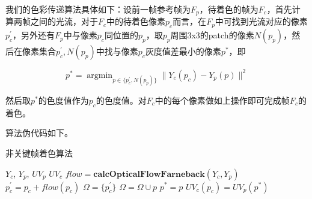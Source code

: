   我们的色彩传递算法具体如下：设前一帧参考帧为$F_p$，待着色的帧为$F_c$，首先计算两帧之间的光流，对于$F_c$中的待着色像素$p_c$而言，在$F_p$中可找到光流对应的像素$p_c^{'}$，另外还有$F_p$中与像素$p_c$同位置的$p_p$，取$p_p$周围3x3的patch的像素$N(p_p)$，然后在像素集合${p_c^{'},N(p_p)}$中找与像素$p_c$灰度值差最小的像素$p^*$，即

  \begin{equation}
  \label{equ:5-interframe}
    p^* = \mathop{\arg\min}_{p \in \{p_c^{'},N(p_p)\}} \|Y_c(p_c) - Y_p(p)\|^2
  \end{equation}

  然后取$p^*$的色度值作为$p_c$的色度值。对$F_c$中的每个像素做如上操作即可完成帧$F_c$的着色。

  算法伪代码如下。

  \begin{algorithm}[H]
  \label{algo:5-interframe}
    \caption*{非关键帧着色算法}
    \begin{algorithmic}[1]
      \Require $Y_c$, $Y_p$, $UV_p$
      \Ensure  $UV_c$
        \State $flow = \textbf{calcOpticalFlowFarneback}(Y_c, Y_p)$
          \State $p_c^{'} = p_c + flow(p_c)$
          \State $\Omega = \{p_c^{'}\}$
            \State $\Omega = \Omega \cup p$
          \EndFor
              \State $p^* = p$
            \EndIf
          \EndFor
          \State $UV_c(p_c) = UV_p(p^*)$
        \EndFor
      \EndFunction
    \end{algorithmic}
  \end{algorithm}